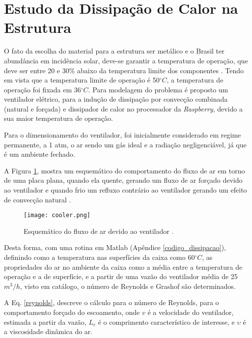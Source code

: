 
\section{Estudo da Dissipação de Calor na Estrutura}

O fato da escolha do material para a estrutura ser metálico e o Brasil ter abundância em incidência solar, deve-se garantir a temperatura de operação, que deve ser entre 20 e $30\%$ abaixo da temperatura limite dos componentes \cite{temperatura}. Tendo em vista que a temperatura limite de operação é 50$^{\circ}C$, a temperatura de operação foi fixada em 36$^{\circ}C$. Para modelagem do problema é proposto um ventilador elétrico, para a indução de dissipação por convecção combinada (natural e forçada) e dissipador de calor no processador da \textit{Raspberry}, devido a sua maior temperatura de operação.

Para o dimensionamento do ventilador, foi inicialmente considerado em regime permanente, a 1 atm, o ar sendo um gás ideal e a radiação negligenciável, já que é um ambiente fechado.

A Figura \ref{cooler}, mostra um esquemático do comportamento do fluxo de ar em torno de uma placa plana, quando ela quente, gerando um fluxo de ar forçado devido ao ventilador e quando frio um refluxo contrário ao ventilador gerando um efeito de convecção natural \cite{livro_transcal}.

\begin{figure}[h]
	\centering
    \texttt{[image: cooler.png]}
    \caption{Esquemático do fluxo de ar devido ao ventilador \cite{livro_transcal}.}
    \label{cooler}
\end{figure}

Desta forma, com uma rotina em Matlab (Apêndice \ref{codigo_dissipacao}), definindo como a temperatura nas superfícies da caixa como 60$^{\circ}C$, as propriedades do ar no ambiente da caixa como a média entre a temperatura de operação e a de superfície, e a partir de uma vazão do ventilador média de 25$m^3/h$, visto em catálogo, o número de Reynolds e Grashof são determinados. 

A Eq. \ref{reynolds}, descreve o cálculo para o número de Reynolds, para o comportamento forçado do escoamento, onde $v$ é a velocidade do ventilador, estimada a partir da vazão, $L_c$ é o comprimento característico de interesse, e $\upsilon$ é a viscosidade dinâmica do ar.

